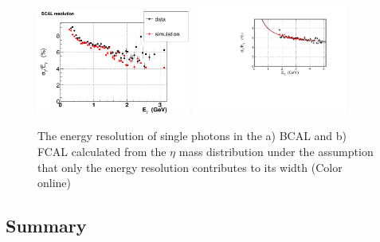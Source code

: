 \begin{figure}[tbh]\centering
\includegraphics[width=0.45\textwidth]{figures/data_RMetaBCAL_EnSymmMean_sim_RMetaBCAL_EnSymmMean_sigma.png} \includegraphics[width=0.45\textwidth]{figures/FCAL_energy_resolution.pdf}
\caption{\label{fig:bcal:eta_resolution} 
The energy resolution of single photons in the a) BCAL and b) FCAL calculated from the $\eta$ mass distribution under the assumption that only the energy resolution contributes to its width
(Color online)
 }
\end{figure}    






\subsection{Summary \label{sec:calsummary}}